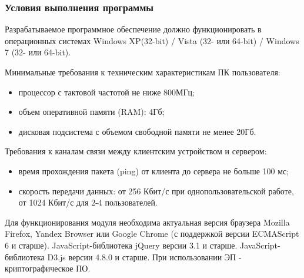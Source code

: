 \documentclass[a4paper]{extarticle}
\begin{document}
\subsubsection{Условия выполнения программы}
Разрабатываемое программное обеспечение должно функционировать в операционных системах Windows XP(32-bit) / Vista (32- или 64-bit) / Windows 7 (32- или 64-bit).\par
Минимальные требования к техническим характеристикам ПК пользователя:\par
\begin{itemize}
  \item процессор с тактовой частотой не ниже 800МГц;
  \item объем оперативной памяти (RAM): 4Гб;
  \item дисковая подсистема с объемом свободной памяти не менее 20Гб.
\end{itemize}\par
Требования к каналам связи между клиентским устройством и сервером:\par
\begin{itemize}
  \item время прохождения пакета (ping) от клиента до сервера не больше 100 мс;
  \item скорость передачи данных: от 256 Кбит/с при однопользовательской работе, от 1024 Кбит/с для 2-4 пользователей.
\end{itemize}\par
Для функционирования модуля необходима актуальная версия браузера Mozilla Firefox, Yandex Browser или Google Chrome (с поддержкой версии ECMAScript 6 и старше). JavaScript-библиотека jQuery версии 3.1 и старше. JavaScript-библиотека D3.js версии 4.8.0 и старше. При использовании ЭП - криптографическое ПО.
\end{document}
